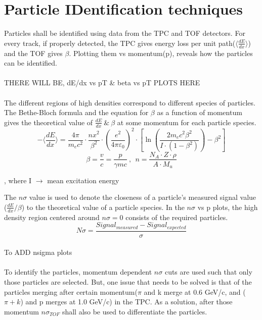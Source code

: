 \documentclass[ALICE,manyauthors]{ALICE_analysis_notes}
\begin{document}
\section[PID techniques]{Particle IDentification techniques}
Particles shall be identified using data from the TPC and TOF detectors. For every track, if properly detected, the TPC gives energy loss per unit path($\langle{ \frac{dE}{dx}}\rangle$) and the TOF gives $\beta$. Plotting them vs momentum(p), reveals how the particles can be identified.\\
\\THERE WILL BE, dE/dx vs pT \& beta vs pT PLOTS HERE\\\\
The different regions of high densities correspond to different species of particles. The Bethe-Bloch formula and the equation for $\beta$ as a function of momentum gives the theoretical value of $\frac{dE}{dx} \ \& \ \beta$ at some momentum for each particle species.\\
\begin{equation}
-\langle\frac{dE}{dx}\rangle=\frac{4\pi}{m_{e}c^2}\cdot\frac{nx^2}{\beta^2}\cdot(\frac{e^2}{4\pi\varepsilon_0})^2\cdot[\ln(\frac{2m_ec^2\beta^2}{I\cdot(1-\beta^2)})-\beta^2]
\end{equation}
\begin{equation}
\beta=\frac{v}{c}=\frac{p}{\gamma mc}\ , \ \
n=\frac{N_A\cdot Z\cdot\rho}{A\cdot M_u}
\end{equation}
\begin{flushright}
	, where I $\rightarrow$ mean excitation energy
\end{flushright}
The $n\sigma$ value is used to denote the closeness of  a particle's measured signal value ($\frac{dE}{dx} / \beta$) to the theoretical value of a particle species. In the $n\sigma$ vs p plots, the high density region centered around $n\sigma=0$ consists of the required particles. 
\begin{equation}
	N\sigma=\frac{Signal_{measured}-Signal_{expected}}{\sigma}
\end{equation}
\\To ADD nsigma plots\\\\
To identify the particles, momentum dependent $n\sigma$ cuts are used such that only those particles are selected.
But, one issue that needs to be solved is that of the particles merging after certain momentum($\pi$ and k merge at 0.6 GeV/c, and ($\pi+k$) and p merges at 1.0 GeV/c) in the TPC. As a solution, after those momentum $n\sigma_{TOF}$ shall also be used to differentiate the particles.
\end{document}
